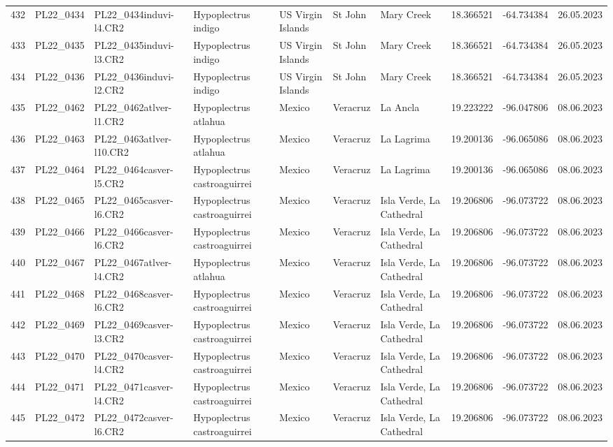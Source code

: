 \begin{table}[ht]
\begin{tabular}{rlllllllll}
  432 & PL22\_0434 & PL22\_0434induvi-l4.CR2 & Hypoplectrus indigo & US Virgin Islands & St John & Mary Creek & 18.366521 & -64.734384 & 26.05.2023 \\ 
  433 & PL22\_0435 & PL22\_0435induvi-l3.CR2 & Hypoplectrus indigo & US Virgin Islands & St John & Mary Creek & 18.366521 & -64.734384 & 26.05.2023 \\ 
  434 & PL22\_0436 & PL22\_0436induvi-l2.CR2 & Hypoplectrus indigo & US Virgin Islands & St John & Mary Creek & 18.366521 & -64.734384 & 26.05.2023 \\ 
  435 & PL22\_0462 & PL22\_0462atlver-l1.CR2 & Hypoplectrus atlahua & Mexico & Veracruz & La Ancla & 19.223222 & -96.047806 & 08.06.2023 \\ 
  436 & PL22\_0463 & PL22\_0463atlver-l10.CR2 & Hypoplectrus atlahua & Mexico & Veracruz & La Lagrima & 19.200136 & -96.065086 & 08.06.2023 \\ 
  437 & PL22\_0464 & PL22\_0464casver-l5.CR2 & Hypoplectrus castroaguirrei & Mexico & Veracruz & La Lagrima & 19.200136 & -96.065086 & 08.06.2023 \\ 
  438 & PL22\_0465 & PL22\_0465casver-l6.CR2 & Hypoplectrus castroaguirrei & Mexico & Veracruz & Isla Verde, La Cathedral & 19.206806 & -96.073722 & 08.06.2023 \\ 
  439 & PL22\_0466 & PL22\_0466casver-l6.CR2 & Hypoplectrus castroaguirrei & Mexico & Veracruz & Isla Verde, La Cathedral & 19.206806 & -96.073722 & 08.06.2023 \\ 
  440 & PL22\_0467 & PL22\_0467atlver-l4.CR2 & Hypoplectrus atlahua & Mexico & Veracruz & Isla Verde, La Cathedral & 19.206806 & -96.073722 & 08.06.2023 \\ 
  441 & PL22\_0468 & PL22\_0468casver-l6.CR2 & Hypoplectrus castroaguirrei & Mexico & Veracruz & Isla Verde, La Cathedral & 19.206806 & -96.073722 & 08.06.2023 \\ 
  442 & PL22\_0469 & PL22\_0469casver-l3.CR2 & Hypoplectrus castroaguirrei & Mexico & Veracruz & Isla Verde, La Cathedral & 19.206806 & -96.073722 & 08.06.2023 \\ 
  443 & PL22\_0470 & PL22\_0470casver-l4.CR2 & Hypoplectrus castroaguirrei & Mexico & Veracruz & Isla Verde, La Cathedral & 19.206806 & -96.073722 & 08.06.2023 \\ 
  444 & PL22\_0471 & PL22\_0471casver-l4.CR2 & Hypoplectrus castroaguirrei & Mexico & Veracruz & Isla Verde, La Cathedral & 19.206806 & -96.073722 & 08.06.2023 \\ 
  445 & PL22\_0472 & PL22\_0472casver-l6.CR2 & Hypoplectrus castroaguirrei & Mexico & Veracruz & Isla Verde, La Cathedral & 19.206806 & -96.073722 & 08.06.2023 \\ 

\end{tabular}
\end{table}
